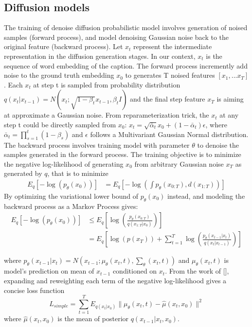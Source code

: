 \documentclass{article}
\begin{document}
\subsection{Diffusion models}
The training of denoise diffusion probabilistic model involves generation of noised samples (forward process), and model denoising Gaussian noise back to the original feature (backward process). Let $x_t$ represent the intermediate representation in the diffusion generation stages. In our context, $x_t$ is the sequence of word embedding of the caption. The forward process incremently add noise to the ground truth embedding $x_0$ to generates T noised features $[x_1, ... x_T]$. Each $x_t$ at step t is sampled from probability distribution $q(x_t | x_{t-1}) = N(x_t; \sqrt{1 - \beta_t}x_{t-1}, \beta_t I)$ and the final step feature $x_T$ is aiming at approximate a Gaussian noise. From reparameterization trick, the $x_t$ at any step t could be directly sampled from $x_0$: $x_t = \sqrt{\bar{\alpha}_t}x_0 + (1 - \bar{\alpha}_t) \epsilon$, where $\bar{\alpha}_t = \prod_{s = 1}^t(1 - \beta_s)$ and $\epsilon$ follows a Multivariant Gaussian Normal distribution. The backward process involves training model with parameter $\theta$ to denoise the samples generated in the forward process. The training objective is to minimize the negative log-likelihood of generating $x_0$ from arbitrary Gaussian noise $x_T$ as generated by $q$, that is to minimize
\begin{align*}
    E_q[-\log(p_{\theta}(x_0))] &= E_q[-\log(\int p_{\theta}(x_{0:T}), d(x_{1:T}))]
\end{align*}
By optimizing the variational lower bound of $p_{\theta}(x_0)$ instead, and modeling the backward process as a Markov Process gives:
\begin{align*}
    E_q[-\log(p_{\theta}(x_0))] &\leq E_q[\log(\frac{p_{\theta}(x_{0:T})}{q(x_{1:T}| x_0)})] \\
    &= E_q[\log(p(x_T)) + \sum_{t = 1}^T\log(\frac{p_{\theta}(x_{t-1} | x_t)}{q(x_t | x_{t-1})})]
\end{align*}

where $p_{\theta}(x_{t-1} | x_t) = N(x_{t-1}; \mu_{\theta}(x_t, t), \sum_{\theta}(x_t, t))$ and $\mu_{\theta}(x_t, t)$ is model's prediction on mean of $x_{t-1}$ conditioned on $x_t$. From the work of [], expanding and reweighting each term of the negative log-likelihood gives a concise loss function 
$$L_{simple} = \sum_{t=1}^T E_{q(x_t | x_0)} \|\mu_{\theta}(x_t, t) - \hat{\mu}(x_t, x_0)\|^2$$
where $\hat{\mu}(x_t, x_0)$ is the mean of posterior $q(x_{t-1} | x_t, x_0)$.
\end{document}
